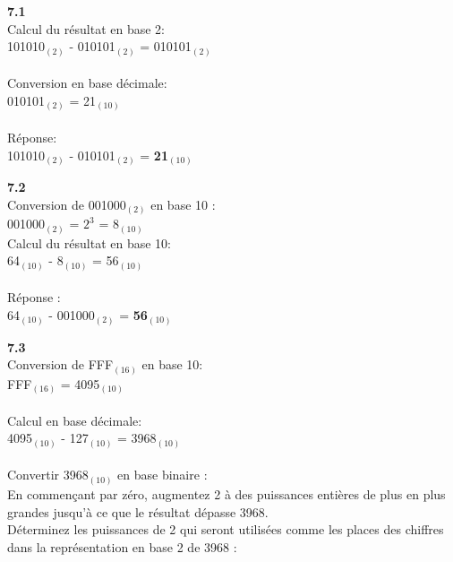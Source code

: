 \begin{Exercice}[20 minutes]
\begin{conseil}
        
    \end{conseil}
    \begin{solution} \textbf{7.1}\\
        Calcul du résultat en base 2:\\
        101010$_{(2)}$ - 010101$_{(2)}$ = 010101$_{(2)}$\\\\
        Conversion en base décimale:\\
        010101$_{(2)}$ = 21$_{(10)}$\\\\
        Réponse:\\
        101010$_{(2)}$ - 010101$_{(2)}$ = \textbf{21$_{(10)}$}\\
    \end{solution}
    
    \begin{solution} \textbf{7.2}\\
        Conversion de 001000$_{(2)}$ en base 10 :\\
        001000$_{(2)}$ = $2^3$ = 8$_{(10)}$\\
        
        Calcul du résultat en base 10:\\
        64$_{(10)}$ - 8$_{(10)}$ = 56$_{(10)}$\\\\
        
        Réponse : \\
        64$_{(10)}$ - 001000$_{(2)}$ = \textbf{56$_{(10)}$}

    \end{solution}
    
    \begin{solution} \textbf{7.3}\\
        Conversion de FFF$_{(16)}$ en base 10:\\
        FFF$_{(16)}$ = 4095$_{(10)}$\\\\
        Calcul en base décimale:\\
        4095$_{(10)}$ - 127$_{(10)}$ = 3968$_{(10)}$\\\\
        Convertir 3968$_{(10)}$ en base binaire :\\
        En commençant par zéro, augmentez 2 à des puissances entières de plus en plus grandes jusqu'à ce que le résultat dépasse 3968.\\
        Déterminez les puissances de 2 qui seront utilisées comme les places des chiffres dans la représentation en base 2 de 3968 :\\


\end{solution}
\end{Exercice}
